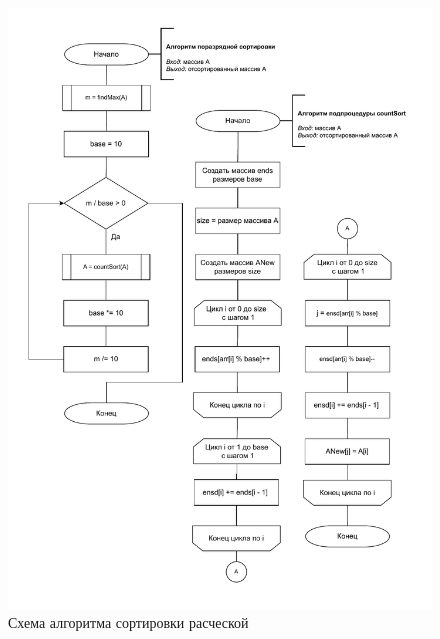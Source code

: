 \clearpage

\begin{figure}[h]
	\centering
	\includegraphics[height=0.9\textheight, page=2]{img/algorithms.pdf}
	\caption{Схема алгоритма сортировки расческой}
	\label{fig:Comb}
\end{figure}

\clearpage

